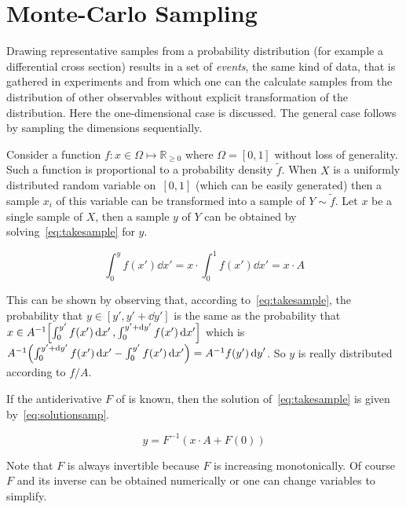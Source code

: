 
\section{Monte-Carlo Sampling}%
\label{sec:mcsamp}

Drawing representative samples from a probability distribution (for
example a differential cross section) results in a set of
\emph{events}, the same kind of data, that is gathered in experiments
and from which one can the calculate samples from the distribution of
other observables without explicit transformation of the
distribution. Here the one-dimensional case is discussed. The general
case follows by sampling the dimensions sequentially.

Consider a function \(f\colon x\in\Omega\mapsto\mathbb{R}_{\geq 0}\)
where \(\Omega = [0, 1]\) without loss of generality. Such a function
is proportional to a probability density \(\tilde{f}\). When \(X\) is
a uniformly distributed random variable on~\([0, 1]\) (which can be
easily generated) then a sample \({x_i}\) of this variable can be
transformed into a sample of \(Y\sim\tilde{f}\). Let \(x\) be a single
sample of \(X\), then a sample \(y\) of \(Y\) can be obtained by
solving~\eqref{eq:takesample} for \(y\).

\begin{equation}
  \label{eq:takesample}
  \int_{0}^{y}f(x')\dd{x'} = x\cdot\int_0^1f(x')\dd{x'} = x\cdot A
\end{equation}

This can be shown by observing that, according
to~\eqref{eq:takesample}, the probability that
\(y\in[y', y'+\dd{y}']\) is the same as the probability that
\(x\in A^{-1}\qty[\int_{0}^{y'}f(x')\dd{x'},
\int_{0}^{y'+\dd{y}'}f(x')\dd{x'}]\) which is
\(A^{-1}\qty(\int_{0}^{y'+\dd{y}'}f(x')\dd{x'} -
\int_{0}^{y'}f(x')\dd{x'}) = A^{-1} f(y')\dd{y}'\). So \(y\) is really
distributed according to \(f/A\).

If the antiderivative \(F\) of is known, then the solution
of~\eqref{eq:takesample} is given by~\eqref{eq:solutionsamp}.

\begin{equation}
  \label{eq:solutionsamp}
  y = F^{-1}(x\cdot A + F(0))
\end{equation}

Note that \(F\) is always invertible because \(F\) is
increasing monotonically. Of course \(F\) and its inverse can be
obtained numerically or one can change variables to simplify.

